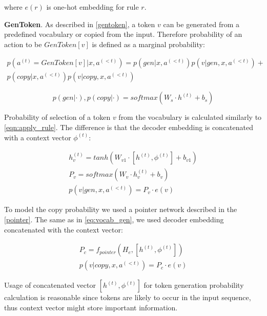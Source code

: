 where $e(r)$ is one-hot embedding for rule $r$.

\textbf{GenToken}. As described in \cref{gentoken}, a token $v$ can be generated from a predefined vocabulary or copied from the input. Therefore probability of an action to be $GenToken[v]$ is defined as a marginal probability:
    
\begin{equation}
\begin{gathered}
    p(a^{(t)} = GenToken[v]|x,a^{(<t)}) = p(gen|x, a^{(<t)}) p(v|gen, x, a^{(<t)}) + \\
    p(copy|x, a^{(<t)}) p(v|copy, x, a^{(<t)})
\end{gathered}
\end{equation}

\begin{equation}
    p(gen|\cdot), p(copy|\cdot) = softmax(W_s\cdot h^{(t)} + b_s)
\end{equation}

Probability of selection of a token $v$ from the vocabulary is calculated similarly to \cref{eqn:apply_rule}. The difference is that the decoder embedding is concatenated with a context vector $\phi^{(t)}$:

\begin{equation}
\begin{gathered}
    h^{(t)}_v = tanh(W _{v1}\cdot [h^{(t)}, \phi^{(t)}] + b_{v1}) \\
    P_v = softmax(W_v\cdot h^{(t)}_v  + b_v) \\
    p(v|gen, x, a^{(<t)}) = P_v\cdot e(v)
\end{gathered}
\label{eq:vocab_gen}
\end{equation}

To model the copy probability we used a pointer network \parencite{Vinyals2015} described in the \cref{pointer}. The same as in \cref{eq:vocab_gen}, we used decoder embedding concatenated with the context vector:

\begin{equation}
\begin{gathered}
    P_c = f_{pointer}(H_e, [h^{(t)}, \phi^{(t)}]) \\
    p(v|copy, x, a^{(<t)}) = P_c \cdot e(v)
\end{gathered}
\end{equation}

Usage of concatenated vector $[h^{(t)}, \phi^{(t)}]$ for token generation probability calculation is reasonable since tokens are likely to occur in the input sequence, thus context vector might store important information.

